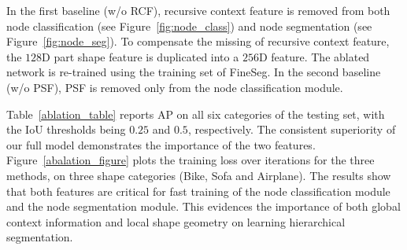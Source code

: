 \begin{table}[!t]\centering\small
{}\vspace{5pt}
\caption{Comparing our full model with two baselines (w/o RCF and w/o PSF) on FineSeg. AP($\%$) is measured with IoU threshold being $0.25$ and $0.5$, respectively.}
 \label{ablation_table}\vspace{-6pt}
\end{table}







In the first baseline (w/o RCF), recursive context feature is removed from both node classification (see Figure~\ref{fig:node_class}) and node segmentation (see Figure~\ref{fig:node_seg}). To compensate the missing of recursive context feature, the $128$D part shape feature is duplicated into a $256$D feature. The ablated network is re-trained using the training set of FineSeg.
In the second baseline (w/o PSF), PSF is removed only from the node classification module.



Table~\ref{ablation_table} reports AP on all six categories of the testing set, with the IoU thresholds being $0.25$ and $0.5$, respectively. The consistent superiority of our full model demonstrates the importance of the two features.
Figure~\ref{abalation_figure} plots the training loss over iterations for the three methods, on three shape categories (Bike, Sofa and Airplane). The results show that both features are critical for fast training of the node classification module and the node segmentation module. This evidences the importance of both global context information and local shape geometry on learning hierarchical segmentation.


